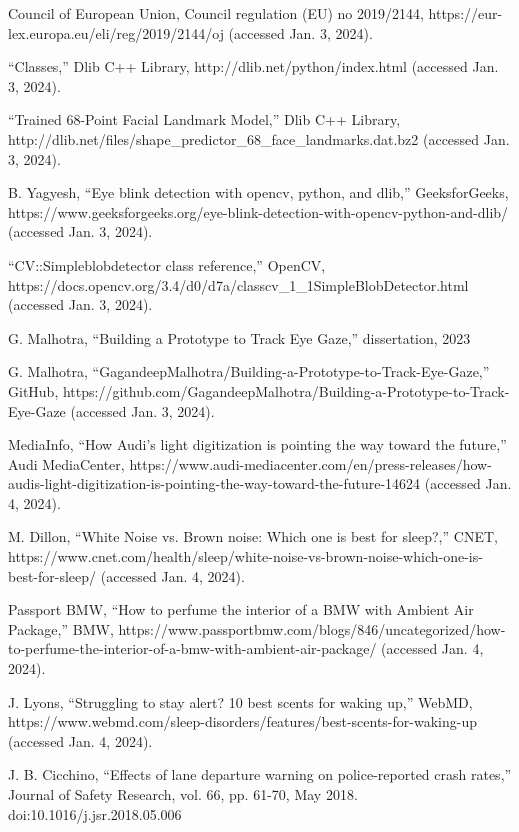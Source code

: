 \documentclass[9pt,conference]{IEEEtran}
\begin{document}
\begin{thebibliography}{00}
     Council of European Union, Council regulation ({EU}) no 2019/2144, https://eur-lex.europa.eu/eli/reg/2019/2144/oj (accessed Jan. 3, 2024).

     “Classes,” Dlib C++ Library, http://dlib.net/python/index.html (accessed Jan. 3, 2024).

     “Trained 68-Point Facial Landmark Model,” Dlib C++ Library, http://dlib.net/files/shape\_predictor\_68\_face\_landmarks.dat.bz2 (accessed Jan. 3, 2024).

     B. Yagyesh, “Eye blink detection with opencv, python, and dlib,” GeeksforGeeks, https://www.geeksforgeeks.org/eye-blink-detection-with-opencv-python-and-dlib/ (accessed Jan. 3, 2024).

     “CV::Simpleblobdetector class reference,” OpenCV, https://docs.opencv.org/3.4/d0/d7a/classcv\_1\_1SimpleBlobDetector.html (accessed Jan. 3, 2024).

     G. Malhotra, “Building a Prototype to Track Eye Gaze,” dissertation, 2023

     G. Malhotra, “GagandeepMalhotra/Building-a-Prototype-to-Track-Eye-Gaze,” GitHub, https://github.com/GagandeepMalhotra/Building-a-Prototype-to-Track-Eye-Gaze (accessed Jan. 3, 2024).

     MediaInfo, “How Audi's light digitization is pointing the way toward the future,” Audi MediaCenter, https://www.audi-mediacenter.com/en/press-releases/how-audis-light-digitization-is-pointing-the-way-toward-the-future-14624 (accessed Jan. 4, 2024).

     M. Dillon, “White Noise vs. Brown noise: Which one is best for sleep?,” CNET, https://www.cnet.com/health/sleep/white-noise-vs-brown-noise-which-one-is-best-for-sleep/ (accessed Jan. 4, 2024).

     Passport BMW, “How to perfume the interior of a BMW with Ambient Air Package,” BMW, https://www.passportbmw.com/blogs/846/uncategorized/how-to-perfume-the-interior-of-a-bmw-with-ambient-air-package/ (accessed Jan. 4, 2024).

     J. Lyons, “Struggling to stay alert? 10 best scents for waking up,” WebMD, https://www.webmd.com/sleep-disorders/features/best-scents-for-waking-up (accessed Jan. 4, 2024).

     J. B. Cicchino, “Effects of lane departure warning on police-reported crash rates,” Journal of Safety Research, vol. 66, pp. 61-70, May 2018. doi:10.1016/j.jsr.2018.05.006


\end{thebibliography}
\end{document}
